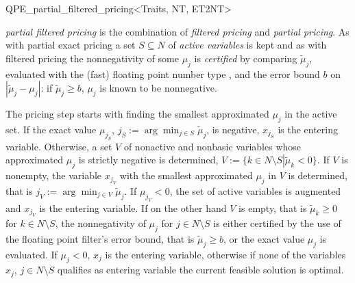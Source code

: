 
\begin{ccRefClass}{QPE_partial_filtered_pricing<Traits, NT, ET2NT>}

\ccDefinition

\emph{partial filtered pricing} is the combination of \emph{filtered pricing}
and \emph{partial pricing}. As with partial exact pricing a set $S \subseteq N$
of \emph{active variables} is kept and as with filtered pricing
the nonnegativity of some $\mu_{j}$ is \emph{certified} by comparing
$\tilde{\mu}_{j}$, evaluated with the (fast) floating point number type
, and the error bound $b$ on
$\left|\tilde{\mu}_{j} - \mu_{j}\right|$: if $\tilde{\mu}_{j} \geq b$,
$\mu_{j}$ is known to be nonnegative.

The pricing step starts with finding the smallest approximated
$\mu_{j}$ in the active set. If the exact value $\mu_{j_{S}}$,
$j_{S}:=\arg\min_{j \in S}\tilde{\mu}_{j}$, is negative, $x_{j_{S}}$ is the
entering variable. Otherwise, a set $V$ of nonactive and nonbasic variables
whose approximated $\mu_{j}$ is strictly negative is determined,
$V:=\{k \in N \setminus S \left|\right. \tilde{\mu}_{k} < 0 \}$. If $V$ is
nonempty, the variable $x_{j_{V}}$ with the smallest approximated
$\mu_{j}$ in $V$ is determined, that is
$j_{V}:=\arg\min_{j \in V}\tilde{\mu}_{j}$. If $\mu_{j_{V}} < 0$, the set of active variables is
augmented and $x_{j_{V}}$ is the entering variable. If on the other hand $V$ is
empty, that is $\tilde{\mu}_{k} \geq 0$ for $k \in N \setminus S$, the
nonnegativity of $\mu_{j}$ for $j \in N \setminus S$ is either certified by the
use of the floating point filter's error bound, that is
$\tilde{\mu}_{j} \geq b$, or the exact value $\mu_{j}$ is evaluated. If
$\mu_{j} <0$, $x_{j}$ is the entering variable, otherwise if none of
the variables $x_{j}$, $j \in N \setminus S$ qualifies as entering variable the
current feasible solution is optimal.


\end{ccRefClass}
